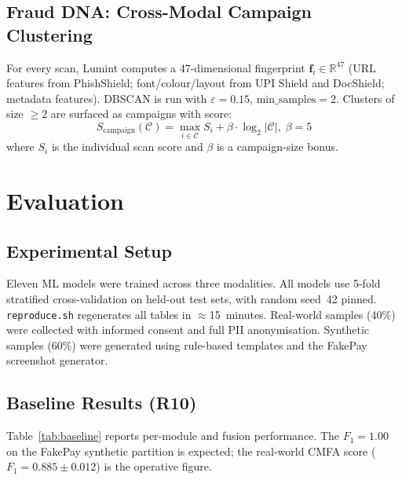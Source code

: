 \documentclass[conference]{IEEEtran}
\begin{document}
\subsection{Fraud DNA: Cross-Modal Campaign Clustering}
\vspace{2mm}
For every scan, Lumint computes a 47-dimensional fingerprint
$\mathbf{f}_i\!\in\!\mathbb{R}^{47}$ (URL features from PhishShield;
font/colour/layout from UPI Shield and DocShield; metadata features).
DBSCAN is run with $\varepsilon{=}0.15$, $\mathrm{min\_samples}{=}2$.
Clusters of size $\geq 2$ are surfaced as campaigns with score:
\begin{equation}
S_{\text{campaign}}(\mathcal{C}) = \max_{i\in\mathcal{C}} S_i + \beta\cdot\log_2|\mathcal{C}|,\; \beta{=}5
\end{equation}
where $S_i$ is the individual scan score and $\beta$ is a
campaign-size bonus.

\section{Evaluation}

\subsection{Experimental Setup}
\vspace{2mm}
Eleven ML models were trained across three modalities. All models use
5-fold stratified cross-validation on held-out test sets, with random
seed~42 pinned. \texttt{reproduce.sh} regenerates all tables in
$\approx$15~minutes. Real-world samples (40\%) were collected with
informed consent and full PII anonymisation. Synthetic samples (60\%)
were generated using rule-based templates and the FakePay screenshot
generator.

\subsection{Baseline Results (R10)}
\vspace{2mm}
Table~\ref{tab:baseline} reports per-module and fusion performance.
The $F_1{=}1.00$ on the FakePay synthetic partition is expected; the
real-world CMFA score ($F_1{=}0.885{\pm}0.012$) is the operative
figure.
\end{document}
